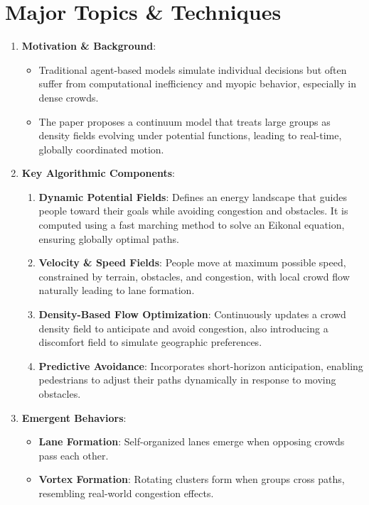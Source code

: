 \documentclass[12pt]{article}
\begin{document}
\section{Major Topics \& Techniques}
\begin{enumerate}[noitemsep]
    \item \textbf{Motivation \& Background}:
    \begin{itemize}[noitemsep]
        \item Traditional agent-based models simulate individual decisions but often suffer from computational inefficiency and myopic behavior, especially in dense crowds.
        \item The paper proposes a continuum model that treats large groups as density fields evolving under potential functions, leading to real-time, globally coordinated motion.
    \end{itemize}
    \item \textbf{Key Algorithmic Components}:
    \begin{enumerate}[label=\alph*), noitemsep]
        \item \textbf{Dynamic Potential Fields}: Defines an energy landscape that guides people toward their goals while avoiding congestion and obstacles. It is computed using a fast marching method to solve an Eikonal equation, ensuring globally optimal paths.
        \item \textbf{Velocity \& Speed Fields}: People move at maximum possible speed, constrained by terrain, obstacles, and congestion, with local crowd flow naturally leading to lane formation.
        \item \textbf{Density-Based Flow Optimization}: Continuously updates a crowd density field to anticipate and avoid congestion, also introducing a discomfort field to simulate geographic preferences.
        \item \textbf{Predictive Avoidance}: Incorporates short-horizon anticipation, enabling pedestrians to adjust their paths dynamically in response to moving obstacles.
    \end{enumerate}
    \item \textbf{Emergent Behaviors}:
    \begin{itemize}[noitemsep]
        \item \textbf{Lane Formation}: Self-organized lanes emerge when opposing crowds pass each other.
        \item \textbf{Vortex Formation}: Rotating clusters form when groups cross paths, resembling real-world congestion effects.

\end{itemize}
\end{enumerate}
\end{document}

